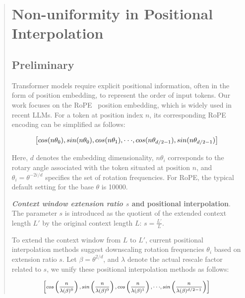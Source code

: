 \begin{abstract}
\section{Non-uniformity in Positional Interpolation}
\label{sec:analysis}

\subsection{Preliminary}

Transformer models require explicit positional information, often in the form of position embedding, to represent the order of input tokens. Our work focuses on the RoPE~\cite{rope} position embedding, which is widely used in recent  LLMs. For a token at position index $n$, its corresponding RoPE encoding can be simplified as follows:

\begin{equation}
		\fontsize{7.8}{7.8} \selectfont
	\label{eq:rope}
	\left[ cos(n\theta_0), sin(n\theta_0), cos(n\theta_1), \cdot\cdot\cdot, cos(n\theta_{d/2-1}), sin(n\theta_{d/2-1}) \right]   
\end{equation}

Here, $d$ denotes the embedding dimensionality, 
 $n\theta_i$ corresponds to the rotary angle associated with the token situated at position $n$, and 
$\theta_i=\theta^{-2i/d}$ specifies the set of rotation frequencies. For RoPE, the typical default setting for the base $\theta$ is 10000. 

\textbf{\emph{Context window extension ratio $s$} and positional interpolation}. The parameter $s$ is introduced as the quotient of the extended context length $L'$ by the original context length $L$: $s=\frac{L'}{L}$.

To extend the context window from $L$ to $L'$, current positional interpolation methods suggest downscaling rotation frequencies $\theta_i$ based on extension ratio $s$. Let $\beta=\theta^{2/d}$, and $\lambda$ denote the actual rescale factor related to $s$, we   unify these positional interpolation methods as follows:

\begin{equation}	
	\fontsize{7.5}{7.5} \selectfont
	\label{eq:unified_rope}
	\begin{aligned}
		\left[cos\left(\frac{n}{\lambda(\beta)^0}\right), sin \left(\frac{n}{\lambda(\beta)^0}\right), cos\left(\frac{n}{\lambda(\beta)^1}\right), \cdot\cdot\cdot,  sin \left(\frac{n}{\lambda(\beta)^{d/2-1}}\right) \right]   
	\end{aligned}
\end{equation}


\end{abstract}
